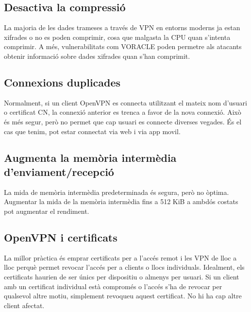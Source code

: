 \documentclass[
  10pt,
]{krantz}
\begin{document}
\hypertarget{desactiva-la-compressiuxf3}{%
\subsection{Desactiva la compressió}\label{desactiva-la-compressiuxf3}}

La majoria de les dades trameses a través de VPN en entorns moderns ja estan xifrades o no es poden comprimir, cosa que malgasta la CPU quan s'intenta comprimir. A més, vulnerabilitats com VORACLE poden permetre als atacants obtenir informació sobre dades xifrades quan s'han comprimit.

\hypertarget{connexions-duplicades}{%
\subsection{Connexions duplicades}\label{connexions-duplicades}}

Normalment, si un client OpenVPN es connecta utilitzant el mateix nom d'usuari o certificat CN, la connexió anterior es trenca a favor de la nova connexió. Això és més segur, però no permet que cap usuari es connecte diverses vegades. És el cas que tenim, pot estar connectat via web i via app movil.

\hypertarget{augmenta-la-memuxf2ria-intermuxe8dia-denviamentrecepciuxf3}{%
\subsection{Augmenta la memòria intermèdia d'enviament/recepció}\label{augmenta-la-memuxf2ria-intermuxe8dia-denviamentrecepciuxf3}}

La mida de memòria intermèdia predeterminada és segura, però no òptima. Augmentar la mida de la memòria intermèdia fins a 512 KiB a ambdós costats pot augmentar el rendiment.

\hypertarget{openvpn-i-certificats}{%
\subsection{OpenVPN i certificats}\label{openvpn-i-certificats}}

La millor pràctica és emprar certificats per a l'accés remot i les VPN de lloc a lloc perquè permet revocar l'accés per a clients o llocs individuals. Idealment, els certificats haurien de ser únics per dispositiu o almenys per usuari. Si un client amb un certificat individual està compromés o l'accés s'ha de revocar per qualsevol altre motiu, simplement revoqueu aquest certificat. No hi ha cap altre client afectat.
\end{document}
